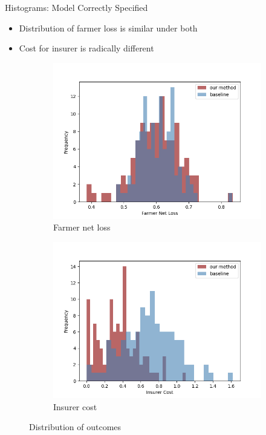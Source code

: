\documentclass{beamer}
\begin{document}
\begin{frame}{Histograms: Model Correctly Specified}
\begin{itemize}
    \item Distribution of farmer loss is similar under both
    \item Cost for insurer is radically different
\end{itemize}
\begin{figure}
\centering
  \begin{subfigure}[b]{0.47\textwidth}
    \includegraphics[width=\textwidth]{../../../output/figures/Logit_Bootstrap/farmer_loss_hist_no_corr_linear.png}
    \caption{Farmer net loss}
    \label{fig:f1}
  \end{subfigure}
 \hfill
  \begin{subfigure}[b]{0.47\textwidth}
    \includegraphics[width=\textwidth]{../../../output/figures/Logit_Bootstrap/insurer_cost_no_corr_linear.png}
    \caption{Insurer cost}
    \label{fig:f2}
  \end{subfigure}
  \caption{Distribution of outcomes}
\end{figure}
    
\end{frame}
\end{document}
